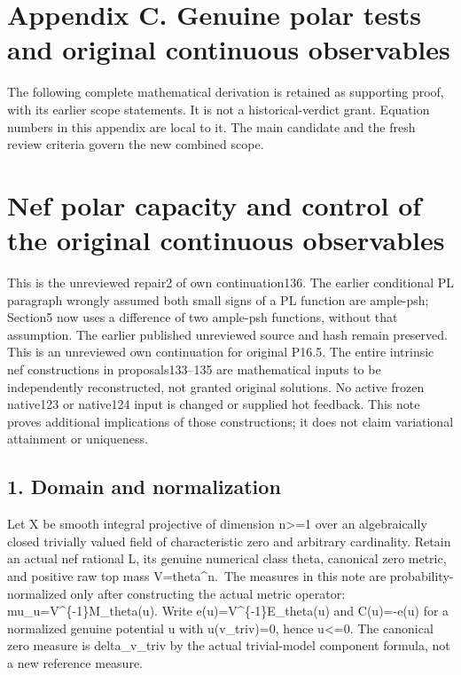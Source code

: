 \documentclass[
  10pt,
]{article}
\begin{document}
\section{Appendix C. Genuine polar tests and original continuous
observables}\label{appendix-c.-genuine-polar-tests-and-original-continuous-observables}

The following complete mathematical derivation is retained as supporting
proof, with its earlier scope statements. It is not a historical-verdict
grant. Equation numbers in this appendix are local to it. The main
candidate and the fresh review criteria govern the new combined scope.

\section{Nef polar capacity and control of the original continuous
observables}\label{nef-polar-capacity-and-control-of-the-original-continuous-observables}

This is the unreviewed repair2 of own continuation136. The earlier
conditional PL paragraph wrongly assumed both small signs of a PL
function are ample-psh; Section5 now uses a difference of two ample-psh
functions, without that assumption. The earlier published unreviewed
source and hash remain preserved. This is an unreviewed own continuation
for original P16.5. The entire intrinsic nef constructions in
proposals133--135 are mathematical inputs to be independently
reconstructed, not granted original solutions. No active frozen
native123 or native124 input is changed or supplied hot feedback. This
note proves additional implications of those constructions; it does not
claim variational attainment or uniqueness.

\subsection{1. Domain and normalization}\label{domain-and-normalization}

Let X be smooth integral projective of dimension n\textgreater=1 over an
algebraically closed trivially valued field of characteristic zero and
arbitrary cardinality. Retain an actual nef rational L, its genuine
numerical class theta, canonical zero metric, and positive raw top mass
V=theta\^{}n.~The measures in this note are probability-normalized only
after constructing the actual metric operator:
mu\_u=V\^{}\{-1\}M\_theta(u). Write e(u)=V\^{}\{-1\}E\_theta(u) and
C(u)=-e(u) for a normalized genuine potential u with u(v\_triv)=0, hence
u\textless=0. The canonical zero measure is delta\_v\_triv by the actual
trivial-model component formula, not a new reference measure.
\end{document}
